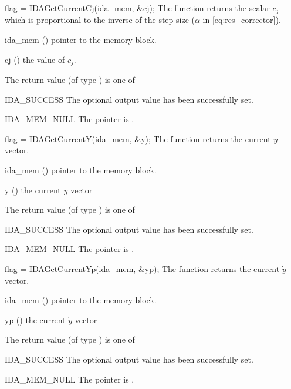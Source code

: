 {
  flag = IDAGetCurrentCj(ida\_mem, \&cj);
}
{
  The function  returns the scalar $c_j$
  which is proportional to the inverse of the step size ($\alpha$ in
  \eqref{eq:res_corrector}).
}
{
  \begin{args}
  \item[ida\_mem] ()
    pointer to the {\ida} memory block.
  \item[cj] ()
    the value of $c_j$.
  \end{args}
}
{
  The return value  (of type ) is one of
  \begin{args}
  \item[IDA\_SUCCESS]
    The optional output value has been successfully set.
  \item[IDA\_MEM\_NULL]
    The  pointer is .
  \end{args}
}
{}

{
  flag = IDAGetCurrentY(ida\_mem, \&y);
}
{
  The function  returns the current $y$ vector.
}
{
  \begin{args}
  \item[ida\_mem] ()
    pointer to the {\ida} memory block.
  \item[y] ()
    the current $y$ vector
  \end{args}
}
{
  The return value  (of type ) is one of
  \begin{args}
  \item[IDA\_SUCCESS]
    The optional output value has been successfully set.
  \item[IDA\_MEM\_NULL]
    The  pointer is .
  \end{args}
}
{}

{
  flag = IDAGetCurrentYp(ida\_mem, \&yp);
}
{
  The function  returns the current $\dot{y}$ vector.
}
{
  \begin{args}
  \item[ida\_mem] ()
    pointer to the {\ida} memory block.
  \item[yp] ()
    the current $\dot{y}$ vector
  \end{args}
}
{
  The return value  (of type ) is one of
  \begin{args}
  \item[IDA\_SUCCESS]
    The optional output value has been successfully set.
  \item[IDA\_MEM\_NULL]
    The  pointer is .
  \end{args}
}
{}


